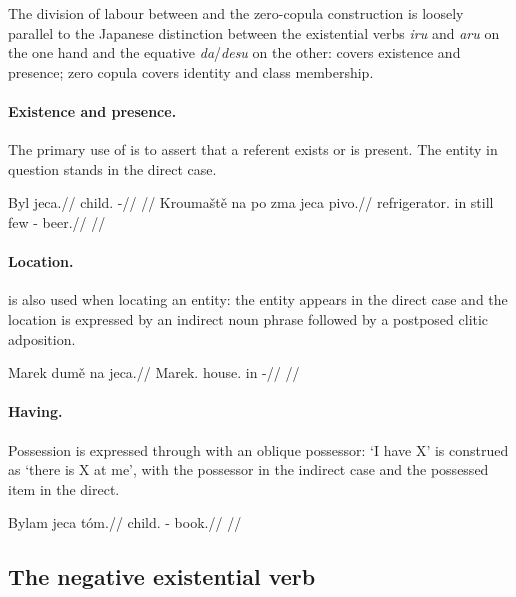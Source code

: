 The division of labour between  and the zero-copula construction is loosely parallel to the Japanese distinction between the existential verbs \textit{iru} and \textit{aru} on the one hand and the equative \textit{da}/\textit{desu} on the other:  covers existence and presence; zero copula covers identity and class membership.

\paragraph{Existence and presence.} The primary use of  is to assert that a referent exists or is present. The entity in question stands in the direct case.

\pex
\a
\begingl
\gla Byl jeca.//
\glb child.\Dir{} \Exst{}-\Cont{}//
\glft {}//
\endgl
\a
\begingl
\gla Kroumaště na po zma jeca pivo.//
\glb refrigerator.\Ind{} in still few \Exst{}-\Cont{} beer.\Dir{}//
\glft {}//
\endgl
\xe

\paragraph{Location.}  is also used when locating an entity: the entity appears in the direct case and the location is expressed by an indirect noun phrase followed by a postposed clitic adposition.

\pex
\a
\begingl
\gla Marek dumě na jeca.//
\glb Marek.\Dir{} house.\Ind{} in \Exst{}-\Cont{}//
\glft {}//
\endgl
\xe

\paragraph{Having.} Possession is expressed through  with an oblique possessor: `I have X' is construed as `there is X at me', with the possessor in the indirect case and the possessed item in the direct.

\pex
\a
\begingl
\gla Bylam jeca tóm.//
\glb child.\Ind{} \Exst{}-\Cont{} book.\Dir{}//
\glft {}//
\endgl
\xe

\subsection{The negative existential verb }\label{sec:zad}

